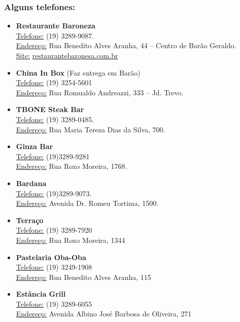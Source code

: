 \subsubsection{Alguns telefones:}

\begin{itemize}
\item  \textbf{Restaurante Baroneza}
\\\underline{Telefone:} (19) 3289-9087.
\\\underline{Endereço:} Rua Benedito Alves Aranha, 44 -- Centro de Barão Geraldo.
\\\underline{Site:} \url{restaurantebaronesa.com.br}

\item  \textbf{China In Box} (Faz entrega em Barão)
\\\underline{Telefone:} (19) 3254-5601
\\\underline{Endereço:} Rua Romualdo Andreazzi, 333 -- Jd. Trevo.

\item  \textbf{TBONE Steak Bar}
\\\underline{Telefone:} (19) 3289-0485.
\\\underline{Endereço:} Rua Maria Tereza Dias da Silva, 700.

\item  \textbf{Ginza Bar}
\\\underline{Telefone:} (19)3289-9281
\\\underline{Endereço:} Rua Roxo Moreira, 1768.

\item  \textbf{Bardana}
\\\underline{Telefone:} (19)3289-9073.
\\\underline{Endereço:} Avenida Dr. Romeu Tortima, 1500.

\item  \textbf{Terraço}
\\\underline{Telefone:} (19) 3289-7920
\\\underline{Endereço:} Rua Roxo Moreira, 1344

\item  \textbf{Pastelaria Oba-Oba}
\\\underline{Telefone:} (19) 3249-1908
\\\underline{Endereço:} Rua Benedito Alves Aranha, 115

\item  \textbf{Estância Grill}
\\\underline{Telefone:} (19) 3289-6055
\\\underline{Endereço:} Avenida Albino José Barbosa de Oliveira, 271


\end{itemize}
